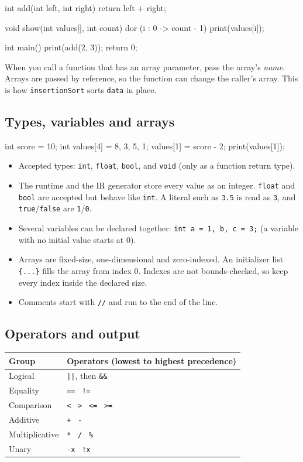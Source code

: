 \documentclass[11pt,a4paper]{article}
\newcommand{\fn}[1]{\texttt{#1}}
\begin{document}
\begin{kite}
int add(int left, int right) {
    return left + right;
}

void show(int values[], int count) {
    dor (i : 0 -> count - 1) {
        print(values[i]);
    }
}

int main() {
    print(add(2, 3));
    return 0;
}
\end{kite}

When you call a function that has an array parameter, pass the array's \emph{name}. Arrays are passed by reference, so the function can change the caller's array. This is how \fn{insertionSort} sorts \fn{data} in place.

\subsection{Types, variables and arrays}

\begin{kite}
int score = 10;
int values[4] = {8, 3, 5, 1};
values[1] = score - 2;
print(values[1]);
\end{kite}

\begin{itemize}
\item Accepted types: \fn{int}, \fn{float}, \fn{bool}, and \fn{void} (only as a function return type).
\item The runtime and the IR generator store every value as an integer. \fn{float} and \fn{bool} are accepted but behave like \fn{int}. A literal such as \fn{3.5} is read as \fn{3}, and \fn{true}/\fn{false} are \fn{1}/\fn{0}.
\item Several variables can be declared together: \fn{int a = 1, b, c = 3;} (a variable with no initial value starts at 0).
\item Arrays are fixed-size, one-dimensional and zero-indexed. An initializer list \fn{\{...\}} fills the array from index 0. Indexes are not bounds-checked, so keep every index inside the declared size.
\item Comments start with \fn{//} and run to the end of the line.
\end{itemize}

\subsection{Operators and output}

\begin{center}
\begin{tabular}{l l}
\toprule
\textbf{Group} & \textbf{Operators} (lowest to highest precedence)\\
\midrule
Logical & \fn{||}, then \fn{\&\&}\\
Equality & \fn{==} \ \fn{!=}\\
Comparison & \fn{<} \ \fn{>} \ \fn{<=} \ \fn{>=}\\
Additive & \fn{+} \ \fn{-}\\
Multiplicative & \fn{*} \ \fn{/} \ \fn{\%}\\
Unary & \fn{-x} \ \fn{!x}\\
\bottomrule
\end{tabular}
\end{center}
\end{document}
